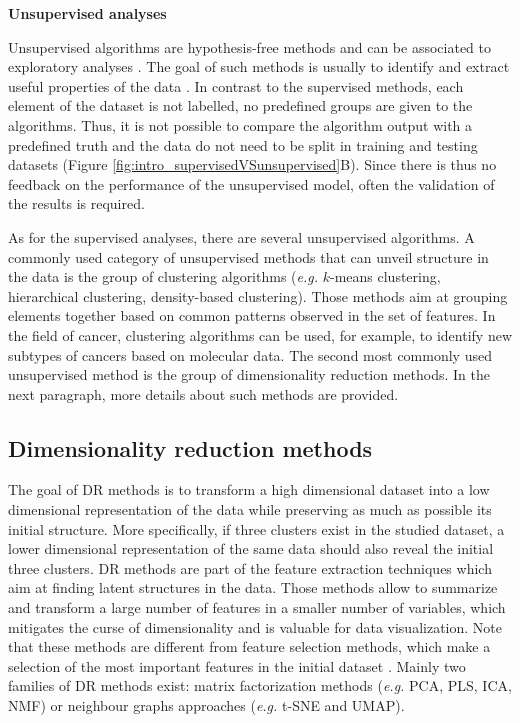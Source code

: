 \textbf{Unsupervised analyses}
\newline 

Unsupervised algorithms are hypothesis-free methods and can be associated to exploratory analyses \cite{Oskolkov}. The goal of such methods is usually to identify and extract useful properties of the data \cite{Eraslan2019}. In contrast to the supervised methods, each element of the dataset is not labelled, no predefined groups are given to the algorithms. Thus, it is not possible to compare the algorithm output with a predefined truth and the data do not need to be split in training and testing datasets (Figure \ref{fig:intro_supervisedVSunsupervised}B). Since there is thus no feedback on the performance of the unsupervised model, often the validation of the results is required. 

As for the supervised analyses, there are several unsupervised algorithms. A commonly used category of unsupervised methods that can unveil structure in the data is the group of clustering algorithms (\textit{e.g.} $k$-means clustering, hierarchical clustering, density-based clustering). Those methods aim at grouping elements together based on common patterns observed in the set of features. In the field of cancer, clustering algorithms can be used, for example, to identify new subtypes of cancers based on molecular data. 
The second most commonly used unsupervised method is the group of dimensionality reduction methods. In the next paragraph, more details about such methods are provided.


\subsection{Dimensionality reduction methods}

The goal of \gls{DR} methods is to transform a high dimensional dataset into a low dimensional representation of the data while preserving as much as possible its initial structure. More specifically, if three clusters exist in the studied dataset, a lower dimensional representation of the same data should also reveal the initial three clusters. \gls{DR} methods are part of the feature extraction techniques which aim at finding latent structures in the data. Those methods allow to summarize and transform a large number of features in a smaller number of variables, which mitigates the curse of dimensionality and is valuable for data visualization. Note that these methods are different from feature selection methods, which make a selection of the most important features in the initial dataset \cite{Hastie2017}. Mainly two families of \gls{DR} methods exist: matrix factorization methods (\textit{e.g.} PCA, PLS, ICA, NMF) or neighbour graphs approaches (\textit{e.g.} t-SNE and UMAP). \newline


